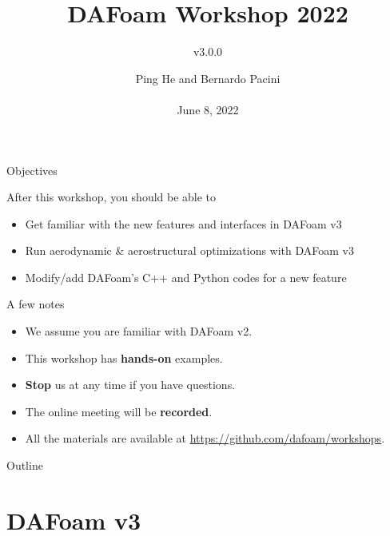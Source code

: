 \documentclass{bredelebeamer}
\title[ ]{DAFoam Workshop 2022}
\subtitle{v3.0.0}
\author{Ping He and Bernardo Pacini \\ ~ \\June 8, 2022 }
\date[June 8, 2022]{}
\begin{document}
\begin{frame}
  \titlepage
\end{frame}



\begin{frame}{Objectives}

After this workshop, you should be able to
\begin{itemize}
  \setlength\itemsep{1em}
 \item Get familiar with the new features and interfaces in DAFoam v3
 \item Run aerodynamic \& aerostructural optimizations with DAFoam v3
 \item Modify/add DAFoam's C++ and Python codes for a new feature
\end{itemize}

\end{frame}

\begin{frame}{A few notes}

  \begin{itemize}
    \setlength\itemsep{1em}
   \item We assume you are familiar with DAFoam v2.
   \item This workshop has \textbf{hands-on} examples.
   \item \textbf{Stop} us at any time if you have questions.
   \item The online meeting will be \textbf{recorded}.
   \item All the materials are available at \url{https://github.com/dafoam/workshops}.
\end{itemize}
  
\end{frame}

\begin{frame}{Outline}
  \tableofcontents
\end{frame}

\section{DAFoam v3}
\renewcommand{\arraystretch}{2}
\end{document}

